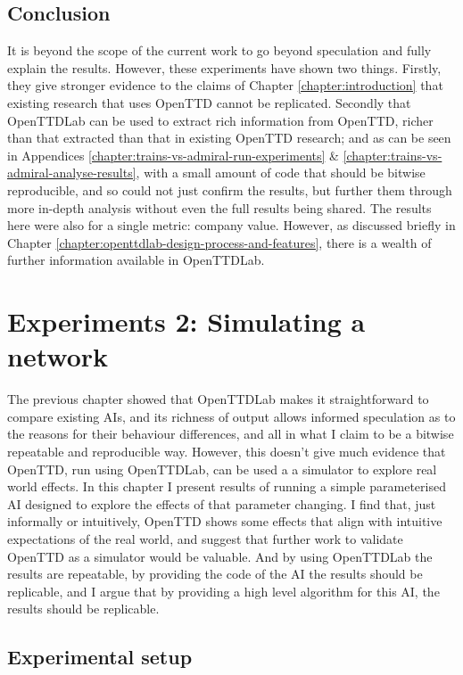 \documentclass[logo,msc,dsti]{style/infthesis}    %
\begin{document}
{\section{Conclusion}

It is beyond the scope of the current work to go beyond speculation and fully explain the results. However, these experiments have shown two things. Firstly, they give stronger evidence to the claims of Chapter \ref{chapter:introduction} that existing research that uses OpenTTD cannot be replicated. Secondly that OpenTTDLab can be used to extract rich information from OpenTTD, richer than that extracted than that in existing OpenTTD research; and as can be seen in Appendices \ref{chapter:trains-vs-admiral-run-experiments} \& \ref{chapter:trains-vs-admiral-analyse-results}, with a small amount of code that should be bitwise reproducible, and so could not just confirm the results, but further them through more in-depth analysis without even the full results being shared. The results here were also for a single metric: company value. However, as discussed briefly in Chapter \ref{chapter:openttdlab-design-process-and-features}, there is a wealth of further information available in OpenTTDLab.

\chapter{Experiments 2: Simulating a network}
\label{chapter:experiments-simple-parameterised-ai}

The previous chapter showed that OpenTTDLab makes it straightforward to compare existing AIs, and its richness of output allows informed speculation as to the reasons for their behaviour differences, and all in what I claim to be a bitwise repeatable and reproducible way. However, this doesn't give much evidence that OpenTTD, run using OpenTTDLab, can be used a a simulator to explore real world effects. In this chapter I present results of running a simple parameterised AI designed to explore the effects of that parameter changing. I find that, just informally or intuitively, OpenTTD shows some effects that align with intuitive expectations of the real world, and suggest that further work to validate OpenTTD as a simulator would be valuable. And by using OpenTTDLab the results are repeatable, by providing the code of the AI the results should be replicable, and I argue that by providing a high level algorithm for this AI, the results should be replicable.

\section{Experimental setup}

}
\end{document}
